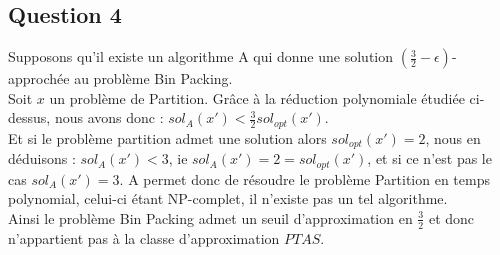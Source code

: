 \subsection{Question 4}\label{ex10_q5}
Supposons qu'il existe un algorithme A qui donne une solution $(\frac{3}{2} -
\epsilon)$-approchée au problème Bin Packing.\\
Soit $x$ un problème de Partition.
Grâce à la réduction polynomiale étudiée ci-dessus, nous avons donc :
$sol_{A}(x') < \frac{3}{2}sol_{opt}(x')$.\\
Et si le problème partition admet une solution alors $sol_{opt}(x') = 2$, nous en
déduisons : $sol_{A}(x') < 3$, ie $sol_A(x') = 2 = sol_{opt}(x')$, et si ce n'est pas le
cas $sol_A(x') = 3$.
A permet donc de résoudre le problème Partition en temps polynomial, celui-ci étant
NP-complet, il n'existe pas un tel algorithme.\\
Ainsi le problème Bin Packing admet un seuil d'approximation en $\frac{3}{2}$ et donc 
n'appartient pas à la classe d'approximation $PTAS$.

